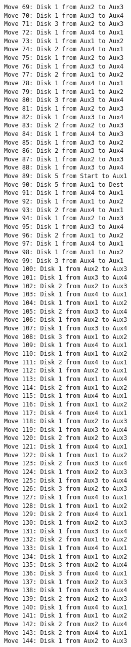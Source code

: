 \documentclass[11pt]{article}
\begin{document}
\begin{multicols}{2}
\begin{Verbatim}[fontsize=\small]
Move 69: Disk 1 from Aux2 to Aux3
Move 70: Disk 1 from Aux3 to Aux4
Move 71: Disk 3 from Aux2 to Aux3
Move 72: Disk 1 from Aux4 to Aux1
Move 73: Disk 1 from Aux1 to Aux2
Move 74: Disk 2 from Aux4 to Aux1
Move 75: Disk 1 from Aux2 to Aux3
Move 76: Disk 1 from Aux3 to Aux4
Move 77: Disk 2 from Aux1 to Aux2
Move 78: Disk 1 from Aux4 to Aux1
Move 79: Disk 1 from Aux1 to Aux2
Move 80: Disk 3 from Aux3 to Aux4
Move 81: Disk 1 from Aux2 to Aux3
Move 82: Disk 1 from Aux3 to Aux4
Move 83: Disk 2 from Aux2 to Aux3
Move 84: Disk 1 from Aux4 to Aux3
Move 85: Disk 1 from Aux3 to Aux2
Move 86: Disk 2 from Aux3 to Aux4
Move 87: Disk 1 from Aux2 to Aux3
Move 88: Disk 1 from Aux3 to Aux4
Move 89: Disk 5 from Start to Aux1
Move 90: Disk 5 from Aux1 to Dest
Move 91: Disk 1 from Aux4 to Aux1
Move 92: Disk 1 from Aux1 to Aux2
Move 93: Disk 2 from Aux4 to Aux1
Move 94: Disk 1 from Aux2 to Aux3
Move 95: Disk 1 from Aux3 to Aux4
Move 96: Disk 2 from Aux1 to Aux2
Move 97: Disk 1 from Aux4 to Aux1
Move 98: Disk 1 from Aux1 to Aux2
Move 99: Disk 3 from Aux4 to Aux1
Move 100: Disk 1 from Aux2 to Aux3
Move 101: Disk 1 from Aux3 to Aux4
Move 102: Disk 2 from Aux2 to Aux3
Move 103: Disk 1 from Aux4 to Aux1
Move 104: Disk 1 from Aux1 to Aux2
Move 105: Disk 2 from Aux3 to Aux4
Move 106: Disk 1 from Aux2 to Aux3
Move 107: Disk 1 from Aux3 to Aux4
Move 108: Disk 3 from Aux1 to Aux2
Move 109: Disk 1 from Aux4 to Aux1
Move 110: Disk 1 from Aux1 to Aux2
Move 111: Disk 2 from Aux4 to Aux1
Move 112: Disk 1 from Aux2 to Aux1
Move 113: Disk 1 from Aux1 to Aux4
Move 114: Disk 2 from Aux1 to Aux2
Move 115: Disk 1 from Aux4 to Aux1
Move 116: Disk 1 from Aux1 to Aux2
Move 117: Disk 4 from Aux4 to Aux1
Move 118: Disk 1 from Aux2 to Aux3
Move 119: Disk 1 from Aux3 to Aux4
Move 120: Disk 2 from Aux2 to Aux3
Move 121: Disk 1 from Aux4 to Aux1
Move 122: Disk 1 from Aux1 to Aux2
Move 123: Disk 2 from Aux3 to Aux4
Move 124: Disk 1 from Aux2 to Aux3
Move 125: Disk 1 from Aux3 to Aux4
Move 126: Disk 3 from Aux2 to Aux3
Move 127: Disk 1 from Aux4 to Aux1
Move 128: Disk 1 from Aux1 to Aux2
Move 129: Disk 2 from Aux4 to Aux1
Move 130: Disk 1 from Aux2 to Aux3
Move 131: Disk 1 from Aux3 to Aux4
Move 132: Disk 2 from Aux1 to Aux2
Move 133: Disk 1 from Aux4 to Aux1
Move 134: Disk 1 from Aux1 to Aux2
Move 135: Disk 3 from Aux2 to Aux4
Move 136: Disk 3 from Aux4 to Aux1
Move 137: Disk 1 from Aux2 to Aux3
Move 138: Disk 1 from Aux3 to Aux4
Move 139: Disk 2 from Aux2 to Aux3
Move 140: Disk 1 from Aux4 to Aux1
Move 141: Disk 1 from Aux1 to Aux2
Move 142: Disk 2 from Aux2 to Aux4
Move 143: Disk 2 from Aux4 to Aux1
Move 144: Disk 1 from Aux2 to Aux3

\end{Verbatim}
\end{multicols}
\end{document}
